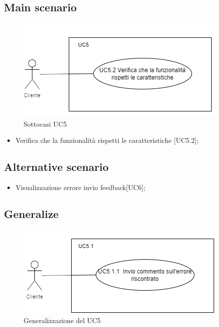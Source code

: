 \documentclass{article}
\begin{document}
    \subsection*{Main scenario}
        \begin{figure}[h]
            \centering
            \includegraphics{./imgUML/UC5-zoom.png}
            \caption{Sottocasi UC5}
            \label{fig:UC5_sottocasi}
        \end{figure}
        \begin{itemize}
            \item Verifica che la funzionalità rispetti le caratteristiche [UC5.2];
        \end{itemize}
        
    \subsection*{Alternative scenario}
    \begin{itemize}
        \item Visualizzazione errore invio feedback[UC6];
    \end{itemize}

    \subsection*{Generalize}
    \begin{figure}[h]
            \centering
            \includegraphics{./imgUML/UC5-zoom1.png}
            \caption{Generalizzazione del UC5}
            \label{fig:UC5_generalizzazione}
        \end{figure}
\end{document}
